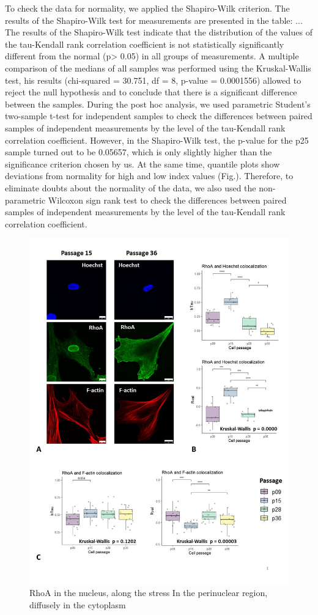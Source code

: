 \documentclass[english,authoryear]{elsarticle}
\begin{document}
To check the data for normality, we applied the Shapiro-Wilk criterion.
The results of the Shapiro-Wilk test for measurements are presented in the table:
...
The results of the Shapiro-Wilk test indicate that the distribution of the values of the tau-Kendall rank correlation coefficient is not statistically significantly different from the normal (p> 0.05) in all groups of measurements. A multiple comparison of the medians of all samples was performed using the Kruskal-Wallis test, his results (chi-squared = 30.751, df = 8, p-value = 0.0001556) allowed to reject the null hypothesis and to conclude that there is a significant difference between the samples.
 During the post hoc analysis, we used parametric Student’s two-sample t-test for independent samples to check the differences between paired samples of independent measurements by the level of the tau-Kendall rank correlation coefficient.
However, in the Shapiro-Wilk test, the p-value for the p25 sample turned out to be 0.05657, which is only slightly higher than the significance criterion chosen by us. At the same time, quantile plots show deviations from normality for high and low index values (Fig.).
Therefore, to eliminate doubts about the normality of the data, we also used the non-parametric Wilcoxon sign rank test to check the differences between paired samples of independent measurements by the level of the tau-Kendall rank correlation coefficient.


\begin{figure}
  \includegraphics[width=0.9\linewidth]{fig_rho-actin-col.jpg}
  \caption{RhoA in the nucleus, along the stress In the perinuclear region, diffusely in the cytoplasm}
  \label{rho-actin-col}
  \centering
\end{figure}
\end{document}
